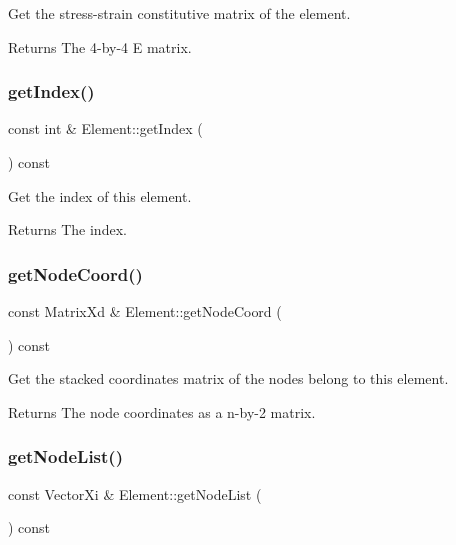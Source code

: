 Get the stress-\/strain constitutive matrix of the element. 

\begin{DoxyReturn}{Returns}
The 4-\/by-\/4 E matrix. 
\end{DoxyReturn}
\mbox{\label{class_element_a85dc312253f1d39c29659393fbb1d485}} 
\subsubsection{\texorpdfstring{get\+Index()}{getIndex()}}
{\footnotesize\ttfamily const int \& Element\+::get\+Index (\begin{DoxyParamCaption}{ }\end{DoxyParamCaption}) const}



Get the index of this element. 

\begin{DoxyReturn}{Returns}
The index. 
\end{DoxyReturn}
\mbox{\label{class_element_a4d12b24e62592a1456e04d15872d5240}} 
\subsubsection{\texorpdfstring{get\+Node\+Coord()}{getNodeCoord()}}
{\footnotesize\ttfamily const Matrix\+Xd \& Element\+::get\+Node\+Coord (\begin{DoxyParamCaption}{ }\end{DoxyParamCaption}) const}



Get the stacked coordinates matrix of the nodes belong to this element. 

\begin{DoxyReturn}{Returns}
The node coordinates as a n-\/by-\/2 matrix. 
\end{DoxyReturn}
\mbox{\label{class_element_a763e0e4a46e68823903557a605dc5474}} 
\subsubsection{\texorpdfstring{get\+Node\+List()}{getNodeList()}}
{\footnotesize\ttfamily const Vector\+Xi \& Element\+::get\+Node\+List (\begin{DoxyParamCaption}{ }\end{DoxyParamCaption}) const}



